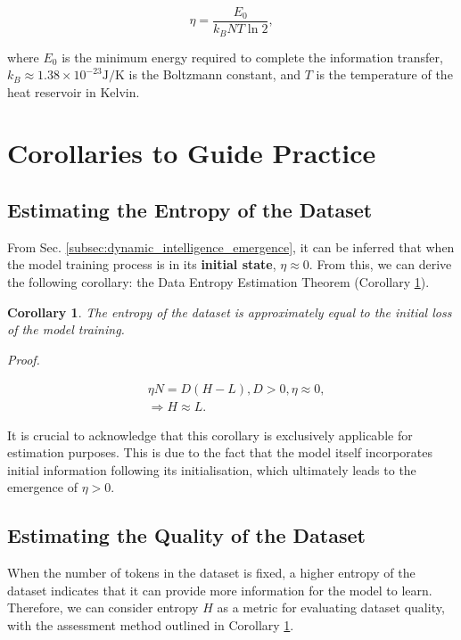 \documentclass{article}
\theoremstyle{plain}
\newtheorem{corollary}[theorem]{Corollary}
\theoremstyle{definition}
\theoremstyle{remark}
\begin{document}
\begin{equation}
\label{eq:landauer}
    \eta = \frac{E_0}{k_B N T \ln 2},
\end{equation}

where $E_0$ is the minimum energy required to complete the information transfer, $k_B \approx 1.38 \times 10^{-23} \text{J/K}$ is the Boltzmann constant, and $T$ is the temperature of the heat reservoir in Kelvin.

\section{Corollaries to Guide Practice}

\subsection{Estimating the Entropy of the Dataset}

From Sec. \ref{subsec:dynamic_intelligence_emergence}, it can be inferred that when the model training process is in its \textbf{initial state}, $\eta \approx 0$. From this, we can derive the following corollary: the Data Entropy Estimation Theorem (Corollary \ref{coro:data_entropy_estimation}).

\begin{corollary}
\label{coro:data_entropy_estimation}
    The entropy of the dataset is approximately equal to the initial loss of the model training.

    Proof.

    \begin{equation}
    \begin{aligned}
        & \eta N = D(H-L), D>0, \eta \approx 0, \\
        & \Rightarrow H \approx L.
    \end{aligned}
    \end{equation}
\end{corollary}

It is crucial to acknowledge that this corollary is exclusively applicable for estimation purposes. This is due to the fact that the model itself incorporates initial information following its initialisation, which ultimately leads to the emergence of $\eta>0$.

\subsection{Estimating the Quality of the Dataset}

When the number of tokens in the dataset is fixed, a higher entropy of the dataset indicates that it can provide more information for the model to learn. Therefore, we can consider entropy $H$ as a metric for evaluating dataset quality, with the assessment method outlined in Corollary \ref{coro:data_entropy_estimation}.
\end{document}
